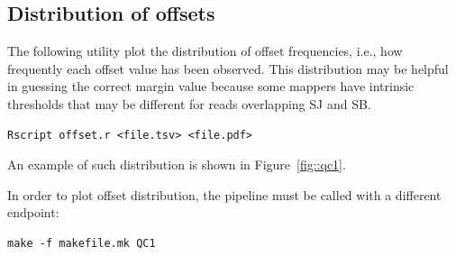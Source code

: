 \documentclass{article}
\begin{document}
\subsection{Distribution of offsets}
The following utility plot the distribution of offset frequencies, i.e., how frequently each offset value has been observed. This distribution may 
be helpful in guessing the correct margin value because some mappers have intrinsic thresholds that may be different for reads overlapping SJ and SB.
\begin{verbatim}
Rscript offset.r <file.tsv> <file.pdf>
\end{verbatim}
An example of such distribution is shown in Figure~\ref{fig::qc1}.
\begin{figure}
\end{figure}
In order to plot offset distribution, the pipeline must be called with a different endpoint:
\begin{verbatim}
make -f makefile.mk QC1
\end{verbatim}
\end{document}
